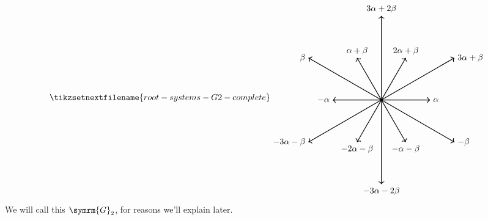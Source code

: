 \documentclass[fleqn]{NotesClass}
\newcommand{\dynkin}[2]{\symrm{#1}_{#2}}
\begin{document}
    \begin{equation}
        \tikzsetnextfilename{root-systems-G2-complete}
        \begin{tikzpicture}[baseline=(current bounding box)]
            \draw[->, thick] (0, 0) -- (2, 0) node [right] {\(\alpha\)};
            \draw[->, thick] (0, 0) -- (150:{2*sqrt(3)}) node [left] {\(\beta\)};
            \draw[->, thick] (0, 0) -- (-2, 0) node [left] {\(-\alpha\)};
            \draw[->, thick] (0, 0) -- (-30:{2*sqrt(3)}) node [right] {\(-\beta\)};
            \draw[->, thick] (0, 0) -- (120:2) node [above] {\(\alpha + \beta\)};
            \draw[->, thick] (0, 0) -- (60:2) node [above] {\(2\alpha + \beta\)};
            \draw[->, thick] (0, 0) -- (0, {2*sqrt(3)}) node [above] {\(3\alpha + 2\beta\)};
            \draw[->, thick] (0, 0) -- (30:{2*sqrt(3)}) node [right] {\(3\alpha + \beta\)};
            \draw[->, thick] (0, 0) -- (-150:{2*sqrt(3)}) node [left] {\(-3\alpha - \beta\)};
            \draw[->, thick] (0, 0) -- (-120:2) node [below] {\(-2\alpha - \beta\)};
            \draw[->, thick] (0, 0) -- (-60:2) node [below] {\(-\alpha - \beta\)};
            \draw[->, thick] (0, 0) -- (0, -{2*sqrt(3)}) node [below] {\(-3\alpha - 2\beta\)};
        \end{tikzpicture}
    \end{equation}
    We will call this \(\dynkin{G}{2}\), for reasons we'll explain later.
    
\end{document}
